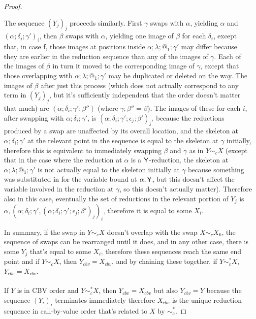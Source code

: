 \begin{proof}
\begin{itemize}
  The sequence $(Y_j)_j$ proceeds similarly. First $\gamma$ swaps with $\alpha$, yielding $\alpha$ and $(\alpha;\delta_i;\gamma')_i$, then $\beta$ swaps with $\alpha$, yielding one image of $\beta$ for each $\delta_i$, except that, in case f, those images at positions inside $\alpha;\lambda;@_1;\gamma'$ may differ because they are earlier in the reduction sequence than any of the images of $\gamma$. Each of the images of $\beta$ in turn it moved to the corresponding image of $\gamma$, except that those overlapping with $\alpha;\lambda;@_1;\gamma'$ may be duplicated or deleted on the way. The images of $\beta$ after just this process (which does not actually correspond to any term in $(Y_j)_j$, but it's sufficiently independent that the order doesn't matter that much) are $(\alpha;\delta_i;\gamma';\beta'')$ (where $\gamma;\beta'' = \beta$). The images of these for each $i$, after swapping with $\alpha;\delta_i;\gamma'$, is $(\alpha;\delta_i;\gamma';\epsilon_j;\beta')_j$, because the reductions produced by a swap are unaffected by its overall location, and the skeleton at $\alpha;\delta_i;\gamma'$ at the relevant point in the sequence is equal to the skeleton at $\gamma$ initially, therefore this is equivalent to immediately swapping $\beta$ and $\gamma$ as in $Y \sim_c X$ (except that in the case where the reduction at $\alpha$ is a $\mathsf{Y}$-reduction, the skeleton at $\alpha;\lambda;@_1;\gamma'$ is not actually equal to the skeleton initially at $\gamma$ because something was substituted in for the variable bound at $\alpha;\mathsf{Y}$, but this doesn't affect the variable involved in the reduction at $\gamma$, so this doesn't actually matter). Therefore also in this case, eventually the set of reductions in the relevant portion of $Y_j$ is $\alpha, (\alpha;\delta_i;\gamma', (\alpha;\delta_i;\gamma';\epsilon_j;\beta')_j)_i$, therefore it is equal to some $X_i$.
\end{itemize}
In summary, if the swap in $Y \sim_c X$ doesn't overlap with the swap $X \sim_c X_0$, the sequence of swaps can be rearranged until it does, and in any other case, there is some $Y_j$ that's equal to some $X_i$, therefore these sequences reach the same end point and if $Y \sim_c X$, then $Y_{cbv} = X_{cbv}$, and by chaining these together, if $Y \sim_c^* X$, $Y_{cbv} = X_{cbv}$.

\paragraph{}
If $Y$ is in CBV order and $Y \sim_c^* X$, then $Y_{cbv} = X_{cbv}$ but also $Y_{cbv} = Y$ because the sequence $(Y_i)_i$ terminates immediately therefore $X_{cbv}$ is the unique reduction sequence in call-by-value order that's related to $X$ by $\sim_c^*$.
\end{proof}

